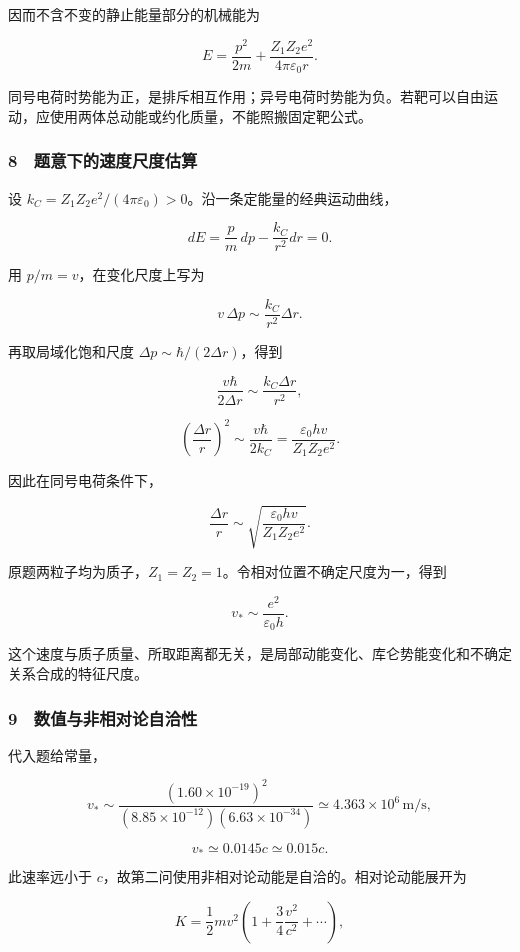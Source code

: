 \documentclass[12pt,a4paper,fontset=fandol]{ctexart}
\begin{document}
因而不含不变的静止能量部分的机械能为

\[\boxed{E=\frac{p^2}{2m}
+\frac{Z_1Z_2e^2}{4\pi\varepsilon_0r}.}\]

同号电荷时势能为正，是排斥相互作用；异号电荷时势能为负。若靶可以自由运动，应使用两体总动能或约化质量，不能照搬固定靶公式。

\subsubsection{8　题意下的速度尺度估算}\label{ux9898ux610fux4e0bux7684ux901fux5ea6ux5c3aux5ea6ux4f30ux7b97}

设 \(k_C=Z_1Z_2e^2/(4\pi\varepsilon_0)>0\)。沿一条定能量的经典运动曲线，

\[dE=\frac pm\,dp-\frac{k_C}{r^2}dr=0.\]

用 \(p/m=v\)，在变化尺度上写为

\[v\,\Delta p\sim\frac{k_C}{r^2}\Delta r.\]

再取局域化饱和尺度 \(\Delta p\sim\hbar/(2\Delta r)\)，得到

\[\frac{v\hbar}{2\Delta r}
\sim\frac{k_C\Delta r}{r^2},\]

\[\boxed{\left(\frac{\Delta r}{r}\right)^2
\sim\frac{v\hbar}{2k_C}
=\frac{\varepsilon_0hv}{Z_1Z_2e^2}.}\]

因此在同号电荷条件下，

\[\boxed{\frac{\Delta r}{r}
\sim\sqrt{\frac{\varepsilon_0hv}{Z_1Z_2e^2}}.}\]

原题两粒子均为质子，\(Z_1=Z_2=1\)。令相对位置不确定尺度为一，得到

\[\boxed{v_*\sim\frac{e^2}{\varepsilon_0h}.}\]

这个速度与质子质量、所取距离都无关，是局部动能变化、库仑势能变化和不确定关系合成的特征尺度。

\subsubsection{9　数值与非相对论自洽性}\label{ux6570ux503cux4e0eux975eux76f8ux5bf9ux8bbaux81eaux6d3dux6027}

代入题给常量，

\[v_*\sim\frac{(1.60\times10^{-19})^2}
{(8.85\times10^{-12})(6.63\times10^{-34})}
\simeq4.363\times10^6\,\mathrm{m/s},\]

\[\boxed{v_*\simeq0.0145c\simeq0.015c.}\]

此速率远小于 \(c\)，故第二问使用非相对论动能是自洽的。相对论动能展开为

\[K=\frac12mv^2\left(1+\frac34\frac{v^2}{c^2}+\cdots\right),\]
\end{document}
